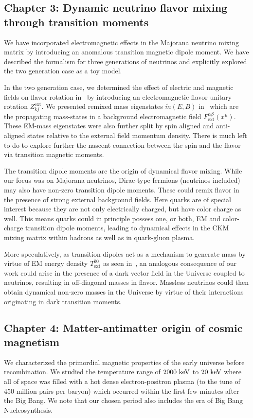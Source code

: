 \subsection*{Chapter 3: Dynamic neutrino flavor mixing through transition moments}
\label{sec:chap3}
We have incorporated electromagnetic effects in the Majorana neutrino mixing matrix by introducing an anomalous transition magnetic dipole moment. We have described the formalism for three generations of neutrinos and explicitly explored the two generation case as a toy model. 

In the two generation case, we determined the effect of electric and magnetic fields on flavor rotation in~ by introducing an electromagnetic flavor unitary rotation $Z_{kj}^\mathrm{ext}$. We presented remixed mass eigenstates $\widetilde m(E,B)$ in~ which are the propagating mass-states in a background electromagnetic field $F^{\alpha\beta}_\mathrm{ext}(x^{\mu})$. These EM-mass eigenstates were also further split by spin aligned and anti-aligned states relative to the external field momentum density. There is much left to do to explore further the nascent connection between the spin and the flavor via transition magnetic moments. 

The transition dipole moments are the origin of dynamical flavor mixing. While our focus was on Majorana neutrinos, Dirac-type fermions (neutrinos included) may also have non-zero transition  dipole moments. These could  remix flavor in the presence of strong external background fields. Here  quarks  are of special interest because they are not only electrically charged, but have color charge as well. This means quarks could in principle possess one, or both, EM and color-charge transition dipole moments, leading to dynamical effects in the CKM mixing matrix within hadrons as well as in quark-gluon plasma.

More speculatively, as transition dipoles act as a mechanism to generate mass by virtue of EM energy density $T_\mathrm{ext}^{00}$ as seen in~, an analogous consequence of our work could arise in the presence of a dark vector field in the Universe coupled to neutrinos, resulting in off-diagonal masses in flavor. Massless neutrinos could then obtain dynamical non-zero masses in the Universe by virtue of their interactions originating in dark transition moments.

\subsection*{Chapter 4: Matter-antimatter origin of cosmic magnetism}
\label{sec:chap4}
We characterized the primordial magnetic properties of the early universe before recombination. We studied the temperature range of $2000\text{ keV}$ to $20\text{ keV}$ where all of space was filled with a hot dense electron-positron plasma (to the tune of 450 million pairs per baryon) which occurred within the first few minutes after the Big Bang. We note that our chosen period also includes the era of Big Bang Nucleosynthesis.

